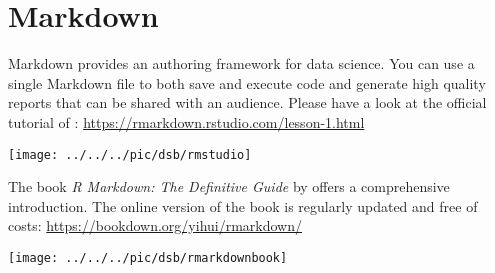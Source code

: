 \chapter{\R Markdown}


\R Markdown provides an authoring framework for data science. You can use a single \R Markdown file to both
save and execute code and
generate high quality reports that can be shared with an audience.
Please have a look at the official tutorial of \Rstudio:
\url{https://rmarkdown.rstudio.com/lesson-1.html}
	\begin{center}
		\texttt{[image: ../../../pic/dsb/rmstudio]}
	\end{center}

\begin{minipage}{0.7\textwidth}
	The book  \textit{R Markdown: The Definitive Guide} by \cite{Xie2018R} offers a comprehensive introduction. The online version of the book is regularly updated and free of costs: \url{https://bookdown.org/yihui/rmarkdown/}
\end{minipage}
\begin{minipage}{0.3\textwidth}
	\begin{center}
		\texttt{[image: ../../../pic/dsb/rmarkdownbook]}
	\end{center}
\end{minipage}



